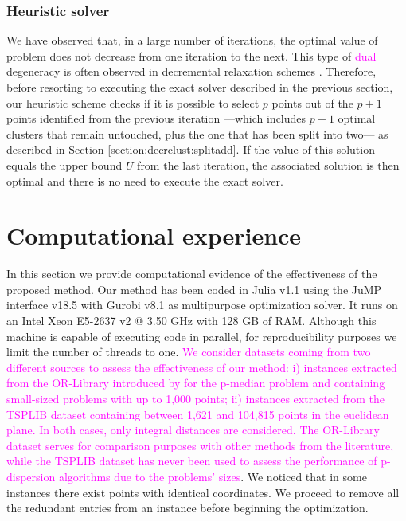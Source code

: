 \documentclass[ijoo,nonblindrev]{informs-ijoo}
\begin{document}
\subsubsection{Heuristic solver}

We have observed that, in a large number of iterations, the optimal value of problem  does not decrease from one iteration to the next. This type of \textcolor{magenta}{dual} degeneracy is often observed in decremental relaxation schemes \citep{Aloise2018sampling, Contardo2019scalable}. Therefore, before resorting to executing the exact solver described in the previous section, our heuristic scheme checks if it is possible to select $p$ points out of the $p + 1$ points identified from the previous iteration ---which includes $p - 1$ optimal clusters that remain untouched, plus the one that has been split into two--- as described in Section \ref{section:decrclust:splitadd}. If the value of this solution equals the upper bound $U$ from the last iteration, the associated solution is then optimal and there is no need to execute the exact solver.

\section{Computational experience\label{section:computation}}

In this section we provide computational evidence of the effectiveness of the proposed method. Our method has been coded in Julia v1.1 using the JuMP interface v18.5 with Gurobi v8.1 as multipurpose optimization solver. It runs on an Intel Xeon E5-2637 v2 @ 3.50 GHz with 128 GB of RAM. Although this machine is capable of executing code in parallel, for reproducibility purposes we limit the number of threads to one. \textcolor{magenta}{We consider datasets coming from two different sources to assess the effectiveness of our method: i) instances extracted from the OR-Library introduced by \citet{orlib} for the p-median problem and containing small-sized problems with up to 1,000 points; ii) instances extracted from the TSPLIB dataset containing between 1,621 and 104,815 points in the euclidean plane. In both cases, only integral distances are considered. The OR-Library dataset serves for comparison purposes with other methods from the literature, while the TSPLIB dataset has never been used to assess the performance of p-dispersion algorithms due to the problems' sizes}. We noticed that in some instances there exist points with identical coordinates. We proceed to remove all the redundant entries from an instance before beginning the optimization.
\end{document}
